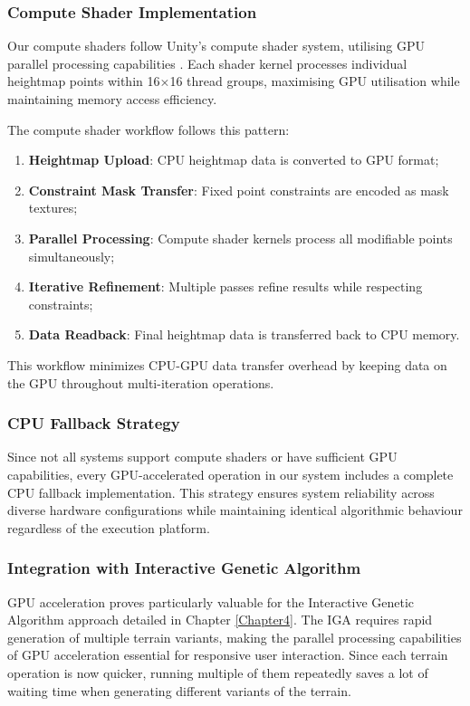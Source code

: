 \subsubsection{Compute Shader Implementation}

Our compute shaders follow Unity's compute shader system, utilising GPU parallel processing capabilities \cite{UnityComputeShaders}. Each shader kernel processes individual heightmap points within 16×16 thread groups, maximising GPU utilisation while maintaining memory access efficiency.

The compute shader workflow follows this pattern:

\begin{enumerate}
    \item \textbf{Heightmap Upload}: CPU heightmap data is converted to GPU format;
    \item \textbf{Constraint Mask Transfer}: Fixed point constraints are encoded as mask textures;
    \item \textbf{Parallel Processing}: Compute shader kernels process all modifiable points simultaneously;
    \item \textbf{Iterative Refinement}: Multiple passes refine results while respecting constraints;
    \item \textbf{Data Readback}: Final heightmap data is transferred back to CPU memory.
\end{enumerate}

This workflow minimizes CPU-GPU data transfer overhead by keeping data on the GPU throughout multi-iteration operations.

\subsubsection{CPU Fallback Strategy}

Since not all systems support compute shaders or have sufficient GPU capabilities, every GPU-accelerated operation in our system includes a complete CPU fallback implementation. This strategy ensures system reliability across diverse hardware configurations while maintaining identical algorithmic behaviour regardless of the execution platform.

\subsubsection{Integration with Interactive Genetic Algorithm}

GPU acceleration proves particularly valuable for the Interactive Genetic Algorithm approach detailed in Chapter \ref{Chapter4}. The IGA requires rapid generation of multiple terrain variants, making the parallel processing capabilities of GPU acceleration essential for responsive user interaction. Since each terrain operation is now quicker, running multiple of them repeatedly saves a lot of waiting time when generating different variants of the terrain.

